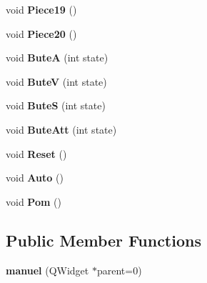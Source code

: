\begin{DoxyCompactItemize}
\item 
\hypertarget{classmanuel_a415fa6ffa8e742dc96dfbff7b09fabda}{}void {\bfseries Piece19} ()\label{classmanuel_a415fa6ffa8e742dc96dfbff7b09fabda}

\item 
\hypertarget{classmanuel_a153ee419c015f0e738d5c28592bbc2a3}{}void {\bfseries Piece20} ()\label{classmanuel_a153ee419c015f0e738d5c28592bbc2a3}

\item 
\hypertarget{classmanuel_a21d99614b897025bde678a43d116c9ea}{}void {\bfseries Bute\+A} (int state)\label{classmanuel_a21d99614b897025bde678a43d116c9ea}

\item 
\hypertarget{classmanuel_a3c32d0f15b8d23a0d97db3c8eb9f5eae}{}void {\bfseries Bute\+V} (int state)\label{classmanuel_a3c32d0f15b8d23a0d97db3c8eb9f5eae}

\item 
\hypertarget{classmanuel_a1814206c6a6774cfd9546a60e38716e0}{}void {\bfseries Bute\+S} (int state)\label{classmanuel_a1814206c6a6774cfd9546a60e38716e0}

\item 
\hypertarget{classmanuel_a22e7d533de06672e422204b4743e1251}{}void {\bfseries Bute\+Att} (int state)\label{classmanuel_a22e7d533de06672e422204b4743e1251}

\item 
\hypertarget{classmanuel_a96fcc81ea011522b162ea0735e5152cb}{}void {\bfseries Reset} ()\label{classmanuel_a96fcc81ea011522b162ea0735e5152cb}

\item 
\hypertarget{classmanuel_ada44cd143e8fe0dec076ae8dc719ec14}{}void {\bfseries Auto} ()\label{classmanuel_ada44cd143e8fe0dec076ae8dc719ec14}

\item 
\hypertarget{classmanuel_aff5e70155acb9426ad7c9b6b11556cc9}{}void {\bfseries Pom} ()\label{classmanuel_aff5e70155acb9426ad7c9b6b11556cc9}

\end{DoxyCompactItemize}
\subsection*{Public Member Functions}
\begin{DoxyCompactItemize}
\item 
\hypertarget{classmanuel_a31a13d8ea56748784c55821c3e09ba23}{}{\bfseries manuel} (Q\+Widget $\ast$parent=0)\label{classmanuel_a31a13d8ea56748784c55821c3e09ba23}

\end{DoxyCompactItemize}
